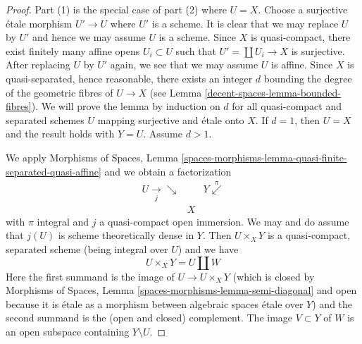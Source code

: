 \begin{proof}
Part (1) is the special case of part (2) where $U = X$.
Choose a surjective \'etale morphism $U' \to U$
where $U'$ is a scheme. It is clear that we may replace $U$ by $U'$
and hence we may assume $U$ is a scheme. Since $X$ is quasi-compact,
there exist finitely many affine opens $U_i \subset U$ such that
$U' = \coprod U_i \to X$ is surjective.
After replacing $U$ by $U'$ again, we see that we may assume $U$ is affine.
Since $X$ is quasi-separated, hence reasonable, there exists an integer
$d$ bounding the degree of the geometric fibres of $U \to X$
(see Lemma \ref{decent-spaces-lemma-bounded-fibres}).
We will prove the lemma by induction on $d$ for all quasi-compact
and separated schemes $U$ mapping surjective and \'etale onto $X$.
If $d = 1$, then $U = X$ and the result holds with $Y = U$.
Assume $d > 1$.

\medskip\noindent
We apply Morphisms of Spaces, Lemma
\ref{spaces-morphisms-lemma-quasi-finite-separated-quasi-affine}
and we obtain a factorization
$$
\begin{array}{ccc}U \underset{j}{\longrightarrow}\searrow &  & Y \overset{\pi}{\swarrow} \\  & X & \end{array}
$$
with $\pi$ integral and $j$ a quasi-compact open immersion. We may and do
assume that $j(U)$ is scheme theoretically dense in $Y$. Then $U \times_X Y$
is a quasi-compact, separated scheme (being integral over $U$) and we have
$$
U \times_X Y = U \amalg W
$$
Here the first summand is the image of $U \to U \times_X Y$
(which is closed by
Morphisms of Spaces, Lemma \ref{spaces-morphisms-lemma-semi-diagonal}
and open because it is \'etale as a morphism between
algebraic spaces \'etale over $Y$) and
the second summand is the (open and closed) complement.
The image $V \subset Y$ of $W$ is an open subspace containing
$Y \setminus U$.


\end{proof}
